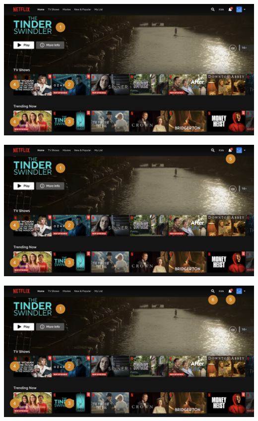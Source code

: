 \documentclass[11pt,aspectratio=169,handout]{beamer}
\begin{document}
\begin{frame}{}

\begin{center}
\includegraphics[scale=0.25]{images/netflix-4.png}
\end{center}

\end{frame}

\begin{frame}{}

\begin{center}
\includegraphics[scale=0.25]{images/netflix-5.png}
\end{center}

\end{frame}

\begin{frame}{}

\begin{center}
\includegraphics[scale=0.25]{images/netflix-6.png}
\end{center}

\end{frame}
\end{document}
